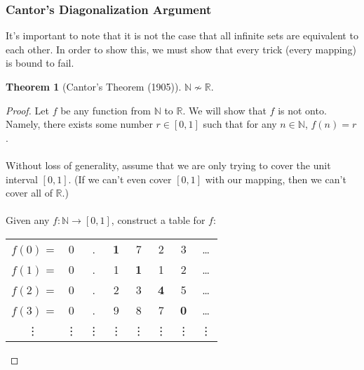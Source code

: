 \documentclass[]{article}
\theoremstyle{definition}
\newtheorem*{theorem}{Theorem}
\newcommand{\lecture}[1]{\marginpar{{\footnotesize $\leftarrow$ \underline{#1}}}}
\begin{document}
      \subsubsection{Cantor's Diagonalization Argument} \lecture{November 21, 2013}
      It's important to note that it is not the case that all infinite sets are equivalent to each other. In order to show this, we must show that every trick (every mapping) is bound to fail.

      \begin{theorem}[Cantor's Theorem (1905)]
        $\mathbb{N} \not \sim \mathbb{R}$.
      \end{theorem}

      \begin{proof}
        Let $f$ be any function from $\mathbb{N}$ to $\mathbb{R}$. We will show that $f$ is not onto. Namely, there exists some number $r \in [0, 1]$ such that for any $n \in \mathbb{N}$, $f(n) = r$.
        \\ \\
        Without loss of generality, assume that we are only trying to cover the unit interval $[0, 1]$.  (If we can't even cover $[0, 1]$ with our mapping, then we can't cover all of $\mathbb{R}$.)
        \\ \\
        Given any $f: \mathbb{N} \to [0, 1]$, construct a table for $f$:
        \begin{center}
          \begin{tabular}{cccccccc}
            $f(0)$ = & 0 & . & \textbf{1} & 7 & 2 & 3 & \ldots \\
            $f(1)$ = & 0 & . & 1 & \textbf{1} & 1 & 2 & \ldots \\
            $f(2)$ = & 0 & . & 2 & 3 & \textbf{4} & 5 & \ldots \\
            $f(3)$ = & 0 & . & 9 & 8 & 7 & \textbf{0} & \ldots \\
            \vdots & \vdots & \vdots & \vdots & \vdots & \vdots & \vdots & \vdots
          \end{tabular}
        \end{center}


\end{proof}
\end{document}
